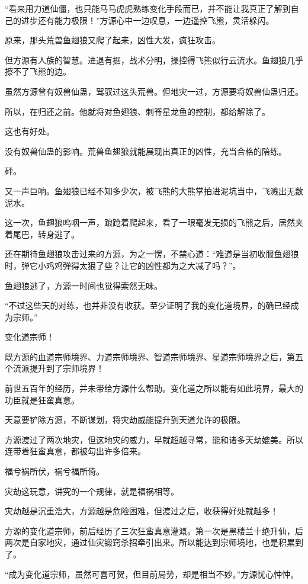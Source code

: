 \begin{this_body}
“看来用力道仙僵，也只能马马虎虎熟练变化手段而已，并不能让我真正了解到自己的进步还有能力极限！”方源心中一边叹息，一边遥控飞熊，灵活躲闪。

原来，那头荒兽鱼翅狼又爬了起来，凶性大发，疯狂攻击。

但方源有人族的智慧。进退有据，战术分明，操控得飞熊似行云流水。鱼翅狼几乎擦不了飞熊的边。

虽然方源曾有奴兽仙蛊，驾驭过这头荒兽。但地灾一过，方源要将奴兽仙蛊归还。

所以，在归还之前。他就将对鱼翅狼、刺脊星龙鱼的控制，都给解除了。

这也有好处。

没有奴兽仙蛊的影响。荒兽鱼翅狼就能展现出真正的凶性，充当合格的陪练。

砰。

又一声巨响。鱼翅狼已经不知多少次，被飞熊的大熊掌拍进泥坑当中，飞溅出无数泥水。

这一次，鱼翅狼呜咽一声，踉跄着爬起来，看了一眼毫发无损的飞熊之后，居然夹着尾巴，转身逃了。

还在期待鱼翅狼攻击过来的方源，为之一愣，不禁心道：“难道是当初收服鱼翅狼时，弹它小鸡鸡弹得太狠了些？让它的凶性都为之大减了吗？”。

鱼翅狼逃了，方源一时间也觉得索然无味。

“不过这些天的对练，也并非没有收获。至少证明了我的变化道境界，的确已经成为宗师。”

变化道宗师！

既方源的血道宗师境界、力道宗师境界、智道宗师境界、星道宗师境界之后，第五个流派提升到了宗师境界！

前世五百年的经历，并未带给方源什么帮助。变化道之所以能有如此境界，最大的功臣就是狂蛮真意。

天意要铲除方源，不断谋划，将灾劫威能提升到天道允许的极限。

方源渡过了两次地灾，但这地灾的威力，早就超越寻常，能和诸多天劫媲美。所以连带着狂蛮真意，都被勾出许多倍来。

福兮祸所伏，祸兮福所倚。

灾劫这玩意，讲究的一个规律，就是福祸相等。

灾劫越是沉重浩大，方源越是危险困难，但渡过之后，收获得好处就越多！

方源的变化道宗师，前后经历了三次狂蛮真意灌溉。第一次是黑楼兰十绝升仙，后两次是自家地灾，通过仙灾锻窍杀招牵引出来。所以能达到宗师境地，也是积累到了。

“成为变化道宗师，虽然可喜可贺，但目前局势，却是相当不妙。”方源忧心忡忡。


\end{this_body}
